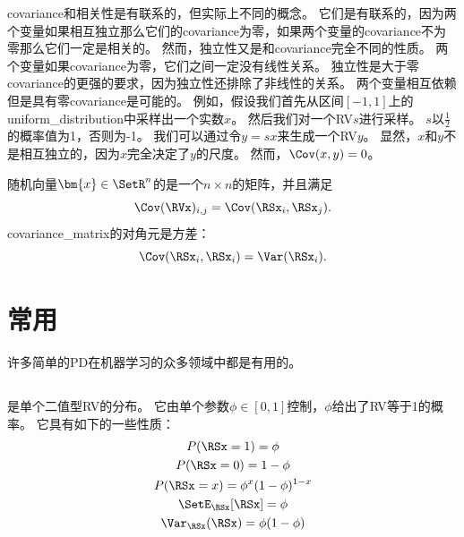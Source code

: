 \gls{covariance}和相关性是有联系的，但实际上不同的概念。
它们是有联系的，因为两个变量如果相互独立那么它们的\gls{covariance}为零，如果两个变量的\gls{covariance}不为零那么它们一定是相关的。
然而，独立性又是和\gls{covariance}完全不同的性质。
两个变量如果\gls{covariance}为零，它们之间一定没有线性关系。
独立性是大于零\gls{covariance}的更强的要求，因为独立性还排除了非线性的关系。
两个变量相互依赖但是具有零\gls{covariance}是可能的。
例如，假设我们首先从区间$[-1, 1]$上的\gls{uniform_distribution}中采样出一个实数$x$。
然后我们对一个\gls{RV}$s$进行采样。
$s$以$\frac{1}{2}$的概率值为1，否则为-1。
我们可以通过令$y=sx$来生成一个\gls{RV}$y$。
显然，$x$和$y$不是相互独立的，因为$x$完全决定了$y$的尺度。
然而，$\Cov(x,y)=0$。


随机向量$\bm{x}\in \SetR^n$的是一个$n\times n$的矩阵，并且满足
\begin{equation}
\Cov(\RVx)_{i,j} = \Cov(\RSx_i, \RSx_j).
\end{equation}
\gls{covariance_matrix}的对角元是方差：
\begin{equation}
\Cov(\RSx_i, \RSx_i) = \Var(\RSx_i).
\end{equation}

\section{常用}
\label{sec:common_probability_distributions}

许多简单的\gls{PD}在机器学习的众多领域中都是有用的。

\subsection{}
\label{sec:bernoulli_distribution}

是单个二值型\gls{RV}的分布。
它由单个参数$\phi \in [0, 1]$控制，$\phi$给出了\gls{RV}等于1的概率。
它具有如下的一些性质：
\begin{gather}
P(\RSx =1) = \phi\\
P(\RSx =0) = 1-\phi\\
P(\RSx = x) = \phi^x (1-\phi)^{1-x}\\
\SetE_{\RSx}[\RSx] = \phi\\
\Var_{\RSx}(\RSx) = \phi(1-\phi)
\end{gather}

\subsection{}
\label{sec:multinoulli_distribution}

